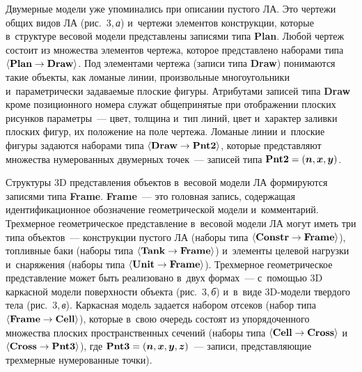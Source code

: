 \begin{multicols}{2}
  
  
  Двумерные модели уже упоминались при описании пустого ЛА. Это чертежи 
общих видов ЛА (рис.~3,\,\textit{а}) и~чертежи элементов конструкции, которые в~структуре
 весовой модели представлены записями типа \textbf{Plan}. 
Любой чертеж состоит из множества элементов чертежа, которое представлено 
наборами типа 
$\langle \mbox{\textbf{Plan}}\hm \to \mbox{\textbf{Draw}}\rangle$. Под 
элементами чертежа (записи типа \textbf{Draw}) понимаются такие 
объекты, как ломаные линии, произвольные многоугольники и~параметрически 
задаваемые плоские фигуры. Атрибутами записей типа \textbf{Draw} 
кроме позиционного номера служат общепринятые при отображении плоских 
рисунков параметры~--- цвет, толщина и~тип линий, цвет и~характер заливки 
плоских фигур, их положение на поле чертежа. Ломаные линии и~плоские 
фигуры задаются наборами типа 
$\langle \mbox{\textbf{Draw}}\hm \to \mbox{\textbf{Pnt2}}\rangle$, которые 
представляют множества нумерованных двумерных точек~--- записей типа 
$\mathbf{Pnt2}\hm=(\boldsymbol{n}, \boldsymbol{x},\boldsymbol{y})$.
  
  Структуры 3D представления объектов в~весовой модели ЛА 
формируются записями типа \textbf{Frame}. 
\textbf{Frame}~--- это головная запись, содержащая 
идентификационное обозначение геометрической модели и~комментарий. 
Трехмерное геометрическое представление в~весовой модели ЛА могут иметь 
три типа объектов~--- конструкции пус\-то\-го ЛА (наборы типа 
$\langle \mbox{\textbf{Constr}}\hm \to \mbox{\textbf{Frame}}\rangle$), 
топливные баки (наборы типа 
$\langle \mbox{\textbf{Tank}}\hm \to \mbox{\textbf{Frame}}\rangle$) 
и~элементы целевой нагрузки и~снаряжения (наборы типа 
$\langle \mbox{\textbf{Unit}}\hm \to \mbox{\textbf{Frame}}\rangle$). 
Трехмерное геометрическое представление может быть реализовано в~двух 
формах~--- с~по\-мощью 3D каркасной модели поверхности объекта 
(рис.~3,\,\textit{б}) и~в~виде 3D-мо\-де\-ли твердого тела (рис.~3,\,\textit{в}). 
Каркасная модель задается набором отсеков (набор типа 
$\langle \mbox{\textbf{Frame}}\hm\to \mbox{\textbf{Cell}}\rangle$), 
которые в~свою очередь состоят из упорядоченного множества плоских 
пространственных сечений (наборы типа 
$\langle \mbox{\textbf{Cell}}\hm \to \mbox{\textbf{Cross}}\rangle$ 
и~$\langle \mbox{\textbf{Cross}}\hm \to \mbox{\textbf{Pnt3}}\rangle$), где 
$\mathbf{Pnt3}\hm=(\boldsymbol{n},\boldsymbol{x},\boldsymbol{y},\boldsymbol{z})$~--- 
записи, пред\-став\-ля\-ющие трехмерные нумерованные точки). 


\end{multicols}
